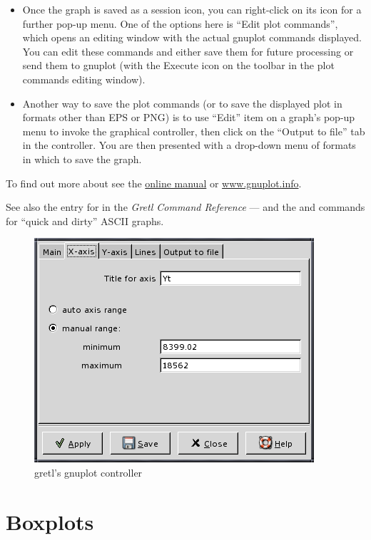 \begin{itemize}
\item Once the graph is saved as a session icon, you can right-click
  on its icon for a further pop-up menu.  One of the options here is
  ``Edit plot commands'', which opens an editing window with the
  actual gnuplot commands displayed. You can edit these commands and
  either save them for future processing or send them to gnuplot (with
  the Execute icon on the toolbar in the plot commands editing
  window).
\item Another way to save the plot commands (or to save the displayed
  plot in formats other than EPS or PNG) is to use ``Edit'' item on a
  graph's pop-up menu to invoke the graphical controller, then click
  on the ``Output to file'' tab in the controller.  You are then
  presented with a drop-down menu of formats in which to save the
  graph.
\end{itemize}

To find out more about  see the
\href{http://ricardo.ecn.wfu.edu/gnuplot.html}{online manual} or
\href{http://www.gnuplot.info/}{www.gnuplot.info}.

See also the entry for  in the \emph{Gretl Command
  Reference} --- and the  and  commands for
``quick and dirty'' ASCII graphs.

\begin{figure}[htbp]
  \begin{center}
    \includegraphics[scale=0.5]{figures/plot_control}
  \end{center}
  \caption{gretl's gnuplot controller}
  \label{fig-plot}
\end{figure}


\section{Boxplots}
\label{sect-boxplots}

